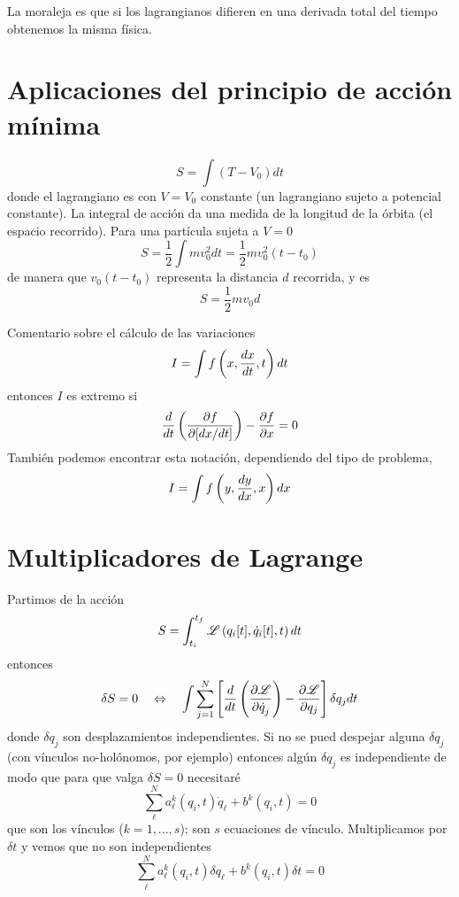 \documentclass[10pt,oneside]{CBFT_article}
\begin{document}
La moraleja es que si los lagrangianos difieren en una derivada total del tiempo obtenemos la misma
física.

\section{Aplicaciones del principio de acción mínima}

\[
S = \int (T-V_0) dt
\]
donde el lagrangiano es con $V=V_0$ constante (un lagrangiano sujeto a potencial constante).
La integral de acción da una medida de la longitud de la órbita (el espacio recorrido).
Para una partícula sujeta a $V=0$
\[
S = \frac{1}{2}\int m v_0^2 dt = \frac{1}{2}mv_0^2(t-t_0)
\]
de manera que $v_0(t-t_0)$ representa la distancia $d$ recorrida, y es 
\[
S = \frac{1}{2}mv_0 d
\]

Comentario sobre el cálculo de las variaciones
\[
I = \int f\left(x, \frac{d^{\hspace{-0.05em}} {x}}{d {t}^{\hspace{-0.05em}}}, t\right) dt 
\]
entonces $I$ es extremo si
\[
\frac{d}{dt} \left( \frac{\partial^{\hspace{-0.05em}} {f}}{\partial {[dx/dt]}^{\hspace{-0.05em}}}\right) - \frac{\partial^{\hspace{-0.05em}} {f}}{\partial {x}^{\hspace{-0.05em}}} = 0
\]
También podemos encontrar esta notación, dependiendo del tipo de problema,
\[
I = \int f\left(y, \frac{d^{\hspace{-0.05em}} {y}}{d {x}^{\hspace{-0.05em}}}, x\right) dx 
\]


\section{Multiplicadores de Lagrange}

Partimos de la acción
\[
S = \int_{t_i}^{t_f} \mathscr{L} \left( q_i[t], \dot{q}_i[t], t \right) dt
\]
entonces 
\[
\delta S = 0 \quad \Leftrightarrow \quad \int
\sum_{j=1}^{N} \left[ \frac{d}{dt}\left( \frac{\partial^{\hspace{-0.05em}} {\mathscr{L}}}{\partial {\dot{q}_j}^{\hspace{-0.05em}}} \right) -\frac{\partial^{\hspace{-0.05em}} {\mathscr{L}}}{\partial {q_j}^{\hspace{-0.05em}}} \right]\delta q_j dt
\]
donde $\delta q_j$ son desplazamientos independientes. Si no se pued despejar alguna $\delta q_j$ (con 
vínculos no-holónomos, por ejemplo) entonces algún $\delta q_j$ es independiente de modo que para que 
valga $\delta S =0 $ necesitaré 
\[
\sum_{\ell}^N a_\ell^k(q_i,t) \dot{q}_\ell + b^k(q_i,t) = 0
\]
que son los vínculos ($k=1,...,s$); son $s$ ecuaciones de vínculo.
Multiplicamos por $\delta t$ y vemos que no son independientes
\[
\sum_{\ell}^N a_\ell^k(q_i,t) \delta {q}_\ell + b^k(q_i,t) \delta t= 0
\]
\end{document}
